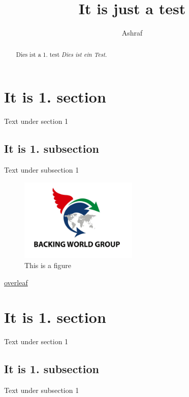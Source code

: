 \documentclass{article}
\title{It is just a test}
\author{Ashraf}
\begin{document}
\maketitle
\begin{abstract}
    Dies ist a 1. test
    \textit{Dies ist ein Test.}
    \end{abstract}

    \section{It is 1. section}
    Text under section 1
    \subsection{It is 1. subsection}
    Text under subsection 1

    \begin{figure}
        \centering
        \includegraphics[width=0.5\textwidth]{BCWCS.jpg}
        \caption{This is a figure}
    \end{figure}
\href{https://www.overleaf.com/}{overleaf}

\section{It is 1. section}
    Text under section 1
    \subsection{It is 1. subsection}
    Text under subsection 1
    
\end{document}

